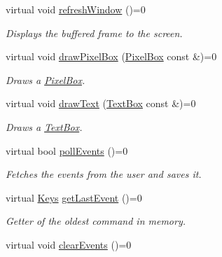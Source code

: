\begin{DoxyCompactItemize}
\mbox{\label{class_arcade_1_1_i_graphic_lib_a58246883702914f057d36de24a33f8e1}} 
virtual void \hyperlink{class_arcade_1_1_i_graphic_lib_a58246883702914f057d36de24a33f8e1}{refresh\+Window} ()=0
\begin{DoxyCompactList}\small\item\em Displays the buffered frame to the screen. \end{DoxyCompactList}\item 
\mbox{\label{class_arcade_1_1_i_graphic_lib_af183213a30dacc943d32027cb784fe93}} 
virtual void \hyperlink{class_arcade_1_1_i_graphic_lib_af183213a30dacc943d32027cb784fe93}{draw\+Pixel\+Box} (\hyperlink{class_arcade_1_1_pixel_box}{Pixel\+Box} const \&)=0
\begin{DoxyCompactList}\small\item\em Draws a \hyperlink{class_arcade_1_1_pixel_box}{Pixel\+Box}. \end{DoxyCompactList}\item 
\mbox{\label{class_arcade_1_1_i_graphic_lib_aae06f5719d6557d70c1c4f7ec5acf9c3}} 
virtual void \hyperlink{class_arcade_1_1_i_graphic_lib_aae06f5719d6557d70c1c4f7ec5acf9c3}{draw\+Text} (\hyperlink{class_arcade_1_1_text_box}{Text\+Box} const \&)=0
\begin{DoxyCompactList}\small\item\em Draws a \hyperlink{class_arcade_1_1_text_box}{Text\+Box}. \end{DoxyCompactList}\item 
virtual bool \hyperlink{class_arcade_1_1_i_graphic_lib_a6be852f0395f08943f988c6823b80937}{poll\+Events} ()=0
\begin{DoxyCompactList}\small\item\em Fetches the events from the user and saves it. \end{DoxyCompactList}\item 
virtual \hyperlink{namespace_arcade_a9b501908b20bc993e4f8226db5323c41}{Keys} \hyperlink{class_arcade_1_1_i_graphic_lib_a801ebd3cff2c861e4b2a1e664c123da7}{get\+Last\+Event} ()=0
\begin{DoxyCompactList}\small\item\em Getter of the oldest command in memory. \end{DoxyCompactList}\item 
virtual void \hyperlink{class_arcade_1_1_i_graphic_lib_a78691f8f9433b2af945576231534c1e3}{clear\+Events} ()=0

\end{DoxyCompactItemize}
